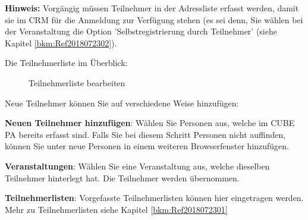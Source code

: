 \textbf{Hinweis:} Vorgängig müssen Teilnehmer in der Adressliste erfasst werden, damit sie im CRM für die Anmeldung zur Verfügung stehen (es sei denn, Sie wählen bei der Veranstaltung die Option 'Selbstregistrierung durch Teilnehmer' (siehe Kapitel \ref{bkm:Ref2018072302}).

\vspace{\baselineskip}

Die Teilnehmerliste im Überblick:

\begin{figure}[H]
\caption{Teilnehmerliste bearbeiten}
\end{figure}

Neue Teilnehmer können Sie auf verschiedene Weise hinzufügen:
\begin{compactitem}
	\item \textbf{Neuen Teilnehmer hinzufügen}: Wählen Sie Personen aus, welche im CUBE PA bereits erfasst sind. Falls Sie bei diesem Schritt Personen nicht auffinden, können Sie unter  neue Personen in einem weiteren Browserfenster hinzufügen.
	\item \textbf{Veranstaltungen}: Wählen Sie eine Veranstaltung aus, welche dieselben Teilnehmer hinterlegt hat. Die Teilnehmer werden übernommen.
	\item \textbf{Teilnehmerlisten}: Vorgefasste Teilnehmerlisten können hier eingetragen werden. Mehr zu Teilnehmerlisten siehe Kapitel \ref{bkm:Ref2018072301}
\end{compactitem}

\vspace{\baselineskip}

